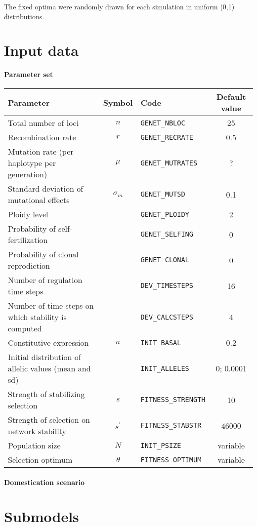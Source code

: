 \documentclass{article}
\begin{document}
The fixed optima were randomly drawn for each simulation in uniform (0,1) distributions. 

\section{Input data}

\paragraph{Parameter set}

\begin{center}
\begin{tabular}{p{4cm}clc}
Parameter & Symbol & Code & Default value \\ \hline
Total number of loci & $n$ & \texttt{GENET\_NBLOC} & 25 \\
Recombination rate & $r$ & \texttt{GENET\_RECRATE} & 0.5 \\
Mutation rate (per haplotype per generation) & $\mu$ & \texttt{GENET\_MUTRATES} & ? \\
Standard deviation of mutational effects & $\sigma_m$ & \texttt{GENET\_MUTSD} & 0.1 \\
Ploidy level & &  \texttt{GENET\_PLOIDY} & 2 \\
Probability of self-fertilization & & \texttt{GENET\_SELFING} & 0 \\
Probability of clonal reprodiction & & \texttt{GENET\_CLONAL} & 0 \\
Number of regulation time steps & & \texttt{DEV\_TIMESTEPS} & 16 \\
Number of time steps on which stability is computed & & \texttt{DEV\_CALCSTEPS} & 4 \\
Constitutive expression & $a$ & \texttt{INIT\_BASAL} & 0.2 \\
Initial distribution of allelic values (mean and sd)& & \texttt{INIT\_ALLELES} & 0; 0.0001 \\
Strength of stabilizing selection & $s$ & \texttt{FITNESS\_STRENGTH} & 10 \\
Strength of selection on network stability & $s^\prime$ & \texttt{FITNESS\_STABSTR} & 46000 \\ \hline
Population size & $N$ & \texttt{INIT\_PSIZE} & variable \\
Selection optimum & $\theta$ & \texttt{FITNESS\_OPTIMUM} & variable \\ 
\end{tabular}
\end{center}

\paragraph{Domestication scenario} 



\section{Submodels}
\end{document}
